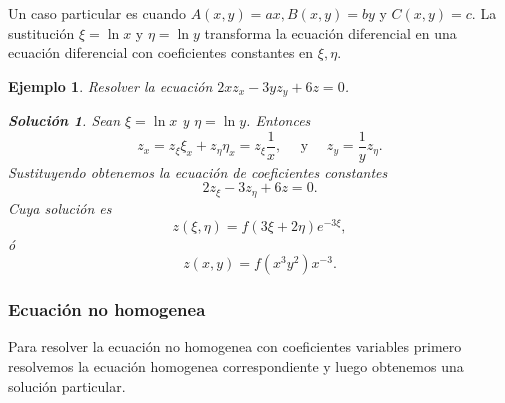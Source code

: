 \documentclass[11pt,letterpaper,draft]{report}
\newtheorem{example}[defn]{Ejemplo}
\newtheorem*{sol}{Solución}
\newcommand\<{\langle}
\renewcommand\>{\rangle}
\begin{document}
Un caso particular es cuando $A(x,y) = ax, B(x,y) = by$ y
$C(x,y) = c$. La sustitución $\xi = \ln x$ y $\eta = \ln
y$ transforma la ecuación diferencial en una ecuación
diferencial con coeficientes constantes en $\xi, \eta$.

\begin{example}
  Resolver la ecuación $2x z_x - 3yz_y + 6z = 0$.
  \begin{sol}
    Sean $\xi = \ln x$ y $\eta = \ln y$. Entonces
    \[
    z_x = z_\xi \xi_x + z_\eta \eta_x = z_\xi \frac{1}{x},
    \quad \text{ y } \quad z_y = \frac{1}{y} z_\eta.
    \] 
    Sustituyendo obtenemos la ecuación de coeficientes
    constantes
    \[
    2z_\xi - 3z_\eta + 6z = 0.
    \] 
    Cuya solución es
    \[
    z(\xi,\eta) = f(3\xi + 2\eta)e^{-3\xi},
    \] 
    ó
    \[
    z(x,y) = f(x^3y^2)x^{-3}.
    \] 
  \end{sol}
\end{example}

\subsubsection{Ecuación no homogenea}

Para resolver la ecuación no homogenea con coeficientes
variables primero resolvemos la ecuación homogenea
correspondiente y luego obtenemos una solución particular.
\end{document}

